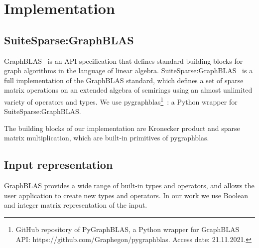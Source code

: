 \section{Implementation}
\label{sec:implementation}
\subsection{SuiteSparse:GraphBLAS}

GraphBLAS~\cite{7761646} is an API specification that defines standard building blocks for graph algorithms in the language of linear algebra. SuiteSparse:GraphBLAS~\cite{10.1145/3322125} is a full implementation of the GraphBLAS standard, which defines a set of sparse matrix operations on an extended algebra of semirings using an almost unlimited variety of operators and types.
We use pygraphblas\footnote{GitHub repository of PyGraphBLAS, a Python wrapper for GraphBLAS
API: https://github.com/Graphegon/pygraphblas. Access date: 21.11.2021.}~\cite{pygraphblas}: a Python wrapper for SuiteSparse:GraphBLAS.

The building blocks of our implementation are Kronecker product and sparse matrix multiplication, which are built-in primitives of pygraphblas.
\subsection{Input representation}
GraphBLAS provides a wide range of built-in types and operators, and allows the user application to create new types and operators. In our work we use Boolean and integer matrix representation of the input.


